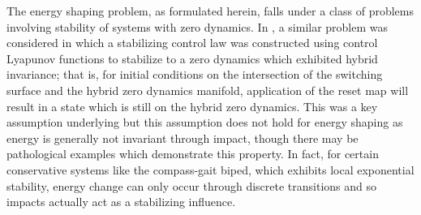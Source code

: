 \documentclass[english]{article}
\begin{document}
The energy shaping problem, as formulated herein, falls under a class of
problems involving stability of systems with zero dynamics.
%
In \cite{Ames2014}, a similar problem was considered in which a stabilizing
control law was constructed using control Lyapunov functions to stabilize to a
zero dynamics which exhibited hybrid invariance; that is, for initial conditions
on the intersection of the switching surface and the hybrid zero dynamics
manifold, application of the reset map will result in a state which is still on
the hybrid zero dynamics.
%
This was a key assumption underlying \cite{Ames2014} but this assumption does
not hold for energy shaping as energy is generally not invariant through impact,
though there may be pathological examples which demonstrate this property.
%
In fact, for certain conservative systems like the compass-gait biped, which
exhibits local exponential stability, energy change can only occur through
discrete transitions and so impacts actually act as a stabilizing influence.
%
%
%
\end{document}
